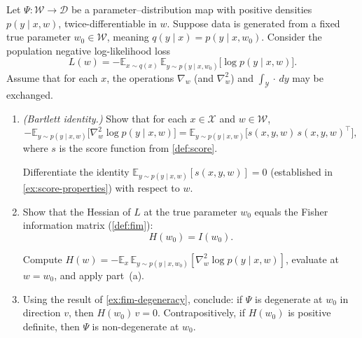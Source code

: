 \documentclass[11pt]{article}
\newcommand{\E}{\mathbb{E}}
\newcommand{\X}{\mathcal{X}}
\newcommand{\Y}{\mathcal{Y}}
\newcommand{\W}{\mathcal{W}}
\newcommand{\D}{\mathcal{D}}
\begin{document}
\begin{exercise}
\label{ex:fim-hessian}
    Let $\Psi : \W \to \D$ be a parameter--distribution map with positive
    densities $p(y \mid x, w)$, twice-differentiable in $w$. Suppose data is
    generated from a fixed true parameter $w_0 \in \W$, meaning
    $q(y \mid x) = p(y \mid x, w_0)$. Consider the population negative
    log-likelihood loss
    \begin{equation}
        L(w)
        = -\E_{x \sim q(x)}\,
            \E_{y \sim p(y \mid x, w_0)}\!\bigl[\log p(y \mid x, w)\bigr].
    \end{equation}
    Assume that for each $x$, the operations $\nabla_w$ (and $\nabla_w^2$)
    and $\int_\Y \cdot\, dy$ may be exchanged.
\begin{enumerate}
    \item
        \emph{(Bartlett identity.)}
        Show that for each $x \in \X$ and $w \in \W$,
        \begin{equation}\label{eq:bartlett}
            -\E_{y \sim p(y \mid x, w)}\!\bigl[
                \nabla_w^2 \log p(y \mid x, w)
            \bigr]
            =
            \E_{y \sim p(y \mid x, w)}\!\bigl[
                s(x,y,w)\, s(x,y,w)^\top
            \bigr],
        \end{equation}
        where $s$ is the score function from \cref{def:score}.
        \begin{hint}
Differentiate the identity
            $\E_{y \sim p(y \mid x, w)}[s(x, y, w)] = 0$
            (established in \cref{ex:score-properties}) with respect to $w$.
        \end{hint}
    \item
        Show that the Hessian of $L$ at the true parameter $w_0$ equals the
        Fisher information matrix (\cref{def:fim}):
        \begin{equation}\label{eq:fim-hessian}
            H(w_0) = I(w_0).
        \end{equation}
        \begin{hint}
Compute $H(w)
            = -\E_{x}\, \E_{y \sim p(y \mid x, w_0)}
                [\nabla_w^2 \log p(y \mid x, w)]$,
            evaluate at $w = w_0$, and apply part~(a).
        \end{hint}
    \item
        Using the result of \cref{ex:fim-degeneracy}, conclude: if $\Psi$ is
        degenerate at $w_0$ in direction $v$, then $H(w_0)\, v = 0$.
        Contrapositively, if $H(w_0)$ is positive definite, then $\Psi$ is
        non-degenerate at $w_0$.
\end{enumerate}
\end{exercise}
\end{document}
